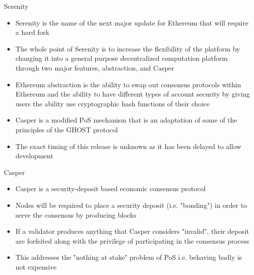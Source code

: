 \documentclass[9pt]{beamer}
\begin{document}

\begin{frame}{Serenity}
	\begin{itemize}
		\item Serenity is the name of the next major update for Ethereum that will require a hard fork
		\item The whole point of Serenity is to increase the flexibility of the platform by changing it into a general purpose decentralized computation platform through two major features, abstraction, and Casper
		\item Ethereum abstraction is the ability to swap out consensus protocols within Ethereum and the ability to have different types of account security by giving users the ability use cryptographic hash functions of their choice
		\item Casper is a modified PoS mechanism that is an adaptation of some of the principles of the GHOST protocol
		\item The exact timing of this release is unknown as it has been delayed to allow development
	\end{itemize}
\end{frame}


\begin{frame}{Casper}
	\begin{itemize}
		\item Casper is a security-deposit based economic consensus protocol
		\item Nodes will be required to place a security deposit (i.e. "bonding") in order to serve the consensus by producing blocks
		\item If a validator produces anything that Casper considers "invalid", their deposit are forfeited along with the privilege of participating in the consensus process
		\item This addresses the "nothing at stake" problem of PoS i.e. behaving badly is not expensive
	\end{itemize}
\end{frame}

\end{document}
